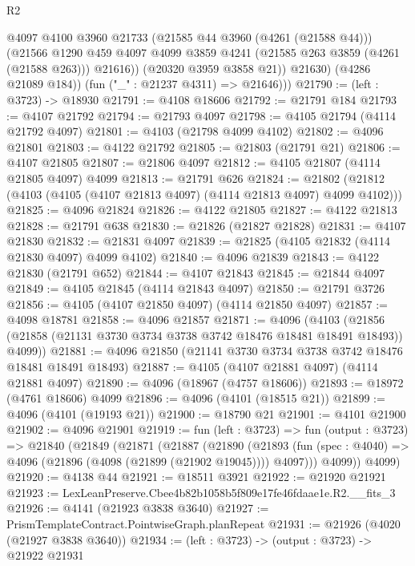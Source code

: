 \begin{lexlean}{R2}
\begin{coremodule}
                @4097
                @4100
                @3960
                @21733
                (@21585 @44 @3960 (@4261 (@21588 @44)))
                (@21566
                  @1290
                  @459
                  @4097
                  @4099
                  @3859
                  @4241
                  (@21585 @263 @3859 (@4261 (@21588 @263)))
                  @21616))
              (@20320 @3959 @3858 @21))
            @21630)
          (@4286 @21089 @184))
        (fun ("_" : @21237 @4311) => @21646)))
@21790 := (left : @3723) -> @18930
@21791 := @4108 @18606
@21792 := @21791 @184
@21793 := @4107 @21792
@21794 := @21793 @4097
@21798 := @4105 @21794 (@4114 @21792 @4097)
@21801 := @4103 (@21798 @4099 @4102)
@21802 := @4096 @21801
@21803 := @4122 @21792
@21805 := @21803 (@21791 @21)
@21806 := @4107 @21805
@21807 := @21806 @4097
@21812 := @4105 @21807 (@4114 @21805 @4097) @4099
@21813 := @21791 @626
@21824 := @21802 (@21812 (@4103 (@4105 (@4107 @21813 @4097) (@4114 @21813 @4097) @4099 @4102)))
@21825 := @4096 @21824
@21826 := @4122 @21805
@21827 := @4122 @21813
@21828 := @21791 @638
@21830 := @21826 (@21827 @21828)
@21831 := @4107 @21830
@21832 := @21831 @4097
@21839 := @21825 (@4105 @21832 (@4114 @21830 @4097) @4099 @4102)
@21840 := @4096 @21839
@21843 := @4122 @21830 (@21791 @652)
@21844 := @4107 @21843
@21845 := @21844 @4097
@21849 := @4105 @21845 (@4114 @21843 @4097)
@21850 := @21791 @3726
@21856 := @4105 (@4107 @21850 @4097) (@4114 @21850 @4097)
@21857 := @4098 @18781
@21858 := @4096 @21857
@21871 := @4096
    (@4103 (@21856 (@21858 (@21131 @3730 @3734 @3738 @3742 @18476 @18481 @18491 @18493)) @4099))
@21881 := @4096 @21850 (@21141 @3730 @3734 @3738 @3742 @18476 @18481 @18491 @18493)
@21887 := @4105 (@4107 @21881 @4097) (@4114 @21881 @4097)
@21890 := @4096 (@18967 (@4757 @18606))
@21893 := @18972 (@4761 @18606) @4099
@21896 := @4096 (@4101 (@18515 @21))
@21899 := @4096 (@4101 (@19193 @21))
@21900 := @18790 @21
@21901 := @4101 @21900
@21902 := @4096 @21901
@21919 := fun (left : @3723) =>
  fun (output : @3723) =>
  @21840
    (@21849
      (@21871
        (@21887
          (@21890
            (@21893 (fun (spec : @4040) => @4096 (@21896 (@4098 (@21899 (@21902 @19045)))) @4097)))
          @4099))
      @4099)
@21920 := @4138 @44
@21921 := @18511 @3921
@21922 := @21920 @21921
@21923 := LexLeanPreserve.Cbee4b82b1058b5f809e17fe46fdaae1e.R2.__fits_3
@21926 := @4141 (@21923 @3838 @3640)
@21927 := PrismTemplateContract.PointwiseGraph.planRepeat
@21931 := @21926 (@4020 (@21927 @3838 @3640))
@21934 := (left : @3723) -> (output : @3723) -> @21922 @21931

\end{coremodule}
\end{lexlean}
